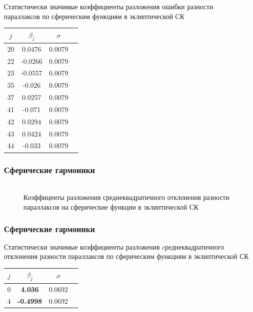 \documentclass[12pt,aspectratio=43]{beamer}
\begin{document}
\begin{frame}
Статистически значимые коэффициенты разложения ошибки разности параллаксов по сферическим функциям в эклиптической СК
\begin{table}[h]
\centering
\begin{tabular}{|c|c|c|c|}
\hline 	
$j$ &$\beta_{j}$ & $\sigma$\\
\hline
\hline
20&	0.0476  &0.0079\\
22&	-0.0266  &0.0079\\
23&	-0.0557  &0.0079\\
35&	-0.026  &0.0079\\
37&	0.0257  &0.0079\\
41&	-0.071 &0.0079\\
42&	0.0294  &0.0079\\
43&	0.0424  &0.0079\\
44&	-0.033  &0.0079\\
\hline 	
\end{tabular}
\end{table}
\end{frame}

\begin{frame}
\frametitle{Сферические гармоники}
\begin{figure}[h!]
\center{\texttt{[image: sf\_j\_d]}}\\{Коэффиценты разложения среднеквадратичного отклонения разности параллаксов на сферические функции в эклиптической СК}
\end{figure}
\end{frame}	

\begin{frame}[<alignment>]
\frametitle{Сферические гармоники}
Статистически значимые коэффициенты разложения cреднеквадратичного отклонения разности параллаксов по сферическим функциям в эклиптической СК
\begin{table}[h]
\centering
\begin{tabular}{|c|c|c|c|}
\hline 	
$j$ &$\beta_{j}$ & $\sigma$\\
\hline
\hline
0	&\textbf{4.036} & 0.0692\\
4	&\textbf{-0.4998} & 0.0692\\
\hline 	
\end{tabular}
\end{table}
\end{frame}	

\setcounter{framenumber}{\value{finalframe}}
\end{document}
